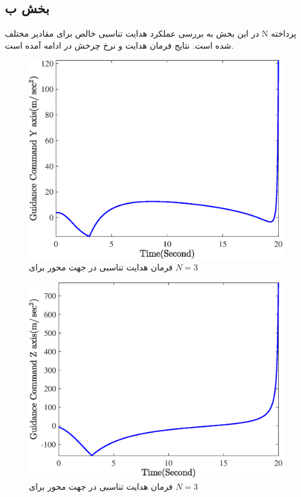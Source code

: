 \subsection{بخش ب}
در این بخش به بررسی عملکرد هدایت تناسبی خالص برای مقادیر مختلف N پرداخته شده است. نتایج فرمان هدایت و نرخ چرخش در ادامه آمده است.

\begin{figure}[H]
	\centering
	\includegraphics[width=.75\linewidth]{../Figure/Q1/b/GC_y_3}
	\caption{فرمان هدایت تناسبی در جهت محور
	 برای 
	 $N=3$}
\end{figure}

\begin{figure}[H]
	\centering
	\includegraphics[width=.75\linewidth]{../Figure/Q1/b/GC_z_3}
	\caption{فرمان هدایت تناسبی در جهت محور
		برای 
		$N=3$}
\end{figure}

